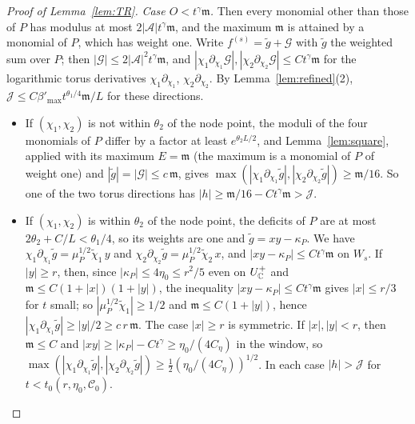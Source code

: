 \begin{proof}[Proof of Lemma~\ref{lem:TR}]
\emph{Case $O<t^\gamma\mathfrak m$.} Then every monomial other than those of $P$ has modulus at most
$2|\mathcal A|t^\gamma\mathfrak m$, and the maximum $\mathfrak m$ is attained by a monomial of $P$, which has weight one. Write
$f^{(s)}=\tilde g+\mathcal G$ with $\tilde g$ the weighted sum over $P$; then $|\mathcal G|\le2|\mathcal A|^2t^\gamma\mathfrak m$, and
$|\chi_1\partial_{\chi_1}\mathcal G|,|\chi_2\partial_{\chi_2}\mathcal G|\le Ct^\gamma\mathfrak m$ for the logarithmic torus derivatives
$\chi_1\partial_{\chi_1}$, $\chi_2\partial_{\chi_2}$. By Lemma~\ref{lem:refined}(2), $\mathcal J\le C\beta'_{\max}t^{\theta_1/4}\mathfrak m/L$
for these directions.
\begin{itemize}
\item If $(\chi_1,\chi_2)$ is not within $\theta_2$ of the node point, the moduli of the four monomials of $P$ differ by a
factor at least $e^{\theta_2L/2}$, and Lemma~\ref{lem:square}, applied with its maximum $E=\mathfrak m$ (the maximum is a
monomial of $P$ of weight one) and $|\tilde g|=|\mathcal G|\le c\,\mathfrak m$, gives
$\max(|\chi_1\partial_{\chi_1}\tilde g|,|\chi_2\partial_{\chi_2}\tilde g|)\ge\mathfrak m/16$. So one of the two torus directions has
$|h|\ge\mathfrak m/16-Ct^\gamma\mathfrak m>\mathcal J$.
\item If $(\chi_1,\chi_2)$ is within $\theta_2$ of the node point, the deficits of $P$ are at most
$2\theta_2+C/L<\theta_1/4$, so its weights are one and $\tilde g=xy-\kappa_P$. We have
$\chi_1\partial_{\chi_1}\tilde g=\mu_P^{1/2}\tilde\chi_1\,y$ and $\chi_2\partial_{\chi_2}\tilde g=\mu_P^{1/2}\tilde\chi_2\,x$, and
$|xy-\kappa_P|\le Ct^\gamma\mathfrak m$ on $W_s$. If $|y|\ge r$, then, since $|\kappa_P|\le4\eta_0\le r^2/5$ even on $U^+_\mathbb C$ and
$\mathfrak m\le C(1+|x|)(1+|y|)$, the inequality $|xy-\kappa_P|\le Ct^\gamma\mathfrak m$ gives $|x|\le r/3$ for $t$ small; so
$|\mu_P^{1/2}\tilde\chi_1|\ge1/2$ and $\mathfrak m\le C(1+|y|)$, hence $|\chi_1\partial_{\chi_1}\tilde g|\ge|y|/2\ge c\,r\,\mathfrak m$.
The case $|x|\ge r$ is symmetric. If $|x|,|y|<r$, then $\mathfrak m\le C$ and
$|xy|\ge|\kappa_P|-Ct^\gamma\ge\eta_0/(4C_\eta)$ in the window, so
$\max(|\chi_1\partial_{\chi_1}\tilde g|,|\chi_2\partial_{\chi_2}\tilde g|)\ge\tfrac12(\eta_0/(4C_\eta))^{1/2}$. In each case
$|h|>\mathcal J$ for $t<t_0(r,\eta_0,\mathscr C_0)$.
\end{itemize}


\end{proof}
